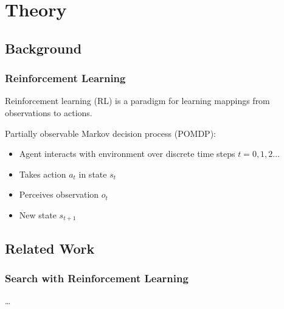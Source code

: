 \section{Theory}

\subsection{Background}

\begin{frame}
    \frametitle{Reinforcement Learning}

    Reinforcement learning (RL) is a paradigm for learning mappings from observations to actions.
    
    Partially observable Markov decision process (POMDP):

    \begin{itemize}
        \item Agent interacts with environment over discrete time steps \(t = 0, 1, 2\dots\)
        \item Takes action \(a_t\) in state \(s_t\)
        \item Perceives observation \(o_t\) 
        \item New state \(s_{t+1}\)
    \end{itemize}

    \begin{figure}
        \centering
        
    \end{figure}
\end{frame}

\subsection{Related Work}

\begin{frame}
    \frametitle{Search with Reinforcement Learning}

    \dots
\end{frame}